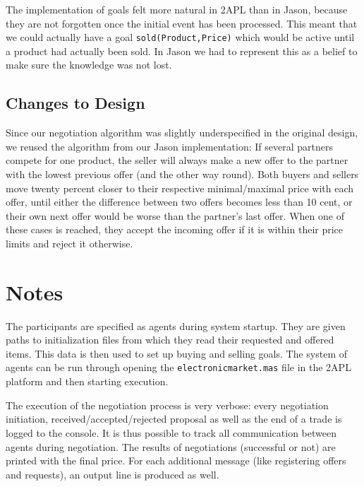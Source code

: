 \documentclass[a4paper,11pt]{article}
\begin{document}
The implementation of goals felt more natural in 2APL than in Jason, because they are not forgotten once the initial event has been processed. This meant that we could actually have a goal \texttt{sold(Product,Price)} which would be active until a product had actually been sold. In Jason we had to represent this as a belief to make sure the knowledge was not lost.

\subsection{Changes to Design}
Since our negotiation algorithm was slightly underspecified in the original design, we reused the algorithm from our Jason implementation: If several partners compete for one product, the seller will always make a new offer to the partner with the lowest previous offer (and the other way round). Both buyers and sellers move twenty percent closer to their respective minimal/maximal price with each offer, until either the difference between two offers becomes less than 10 cent, or their own next offer would be worse than the partner's last offer. When one of these cases is reached, they accept the incoming offer if it is within their price limits and reject it otherwise.

\section{Notes}
The participants are specified as agents during system startup. They are given paths to initialization files from which they read their requested and offered items. This data is then used to set up buying and selling goals. The system of agents can be run through opening the \texttt{electronicmarket.mas} file in the 2APL platform and then starting execution.

The execution of the negotiation process is very verbose: every negotiation initiation, received/accepted/rejected proposal as well as the end of a trade is logged to the console. It is thus possible to track all communication between agents during negotiation. The results of negotiations (successful or not) are printed with the final price. For each additional message (like registering offers and requests), an output line is produced as well.
\end{document}
